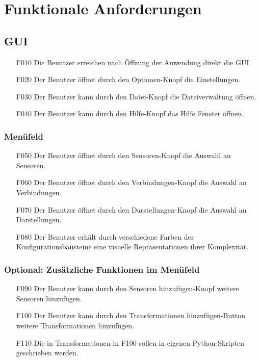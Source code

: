 \documentclass[parskip=full]{scrartcl}
\begin{document}
\section{Funktionale Anforderungen}


\subsection{GUI}

\begin{itemize}
\item[F010] Die Benutzer erreichen nach Öffnung der Anwendung direkt die GUI.
\item[F020] Der Benutzer öffnet durch den Optionen-Knopf die Einstellungen.
\item[F030] Der Benutzer kann durch den Datei-Knopf die Dateiverwaltung öffnen.
\item[F040] Der Benutzer kann durch den Hilfe-Knopf das Hilfe Fenster öffnen.
\end{itemize}

\subsubsection{Menüfeld}

\begin{itemize}
\item[F050] Der Benutzer öffnet durch den Sensoren-Knopf die Auswahl an Sensoren.
\item[F060] Der Benutzer öffnet durch den Verbindungen-Knopf die Auswahl an Verbindungen.
\item[F070] Der Benutzer öffnet durch den Darstellungen-Knopf die Auswahl an Darstellungen.
\item[F080] Der Benutzer erhält durch verschiedene Farben der Konfigurationsbausteine eine visuelle Repräsentationen ihrer Komplexität.
\end{itemize}

\subsubsection{Optional: Zusätzliche Funktionen im Menüfeld}

\begin{itemize}

\item[F090] Der Benutzer kann durch den Sensoren hinzufügen-Knopf weitere Sensoren hinzufügen.
\item[F100] Der Benutzer kann durch den Transformationen hinzufügen-Button weitere Transformationen hinzufügen.
\item[F110] Die in Transformationen in F100 sollen in eigenen Python-Skripten geschrieben werden.
\end{itemize}
\end{document}
